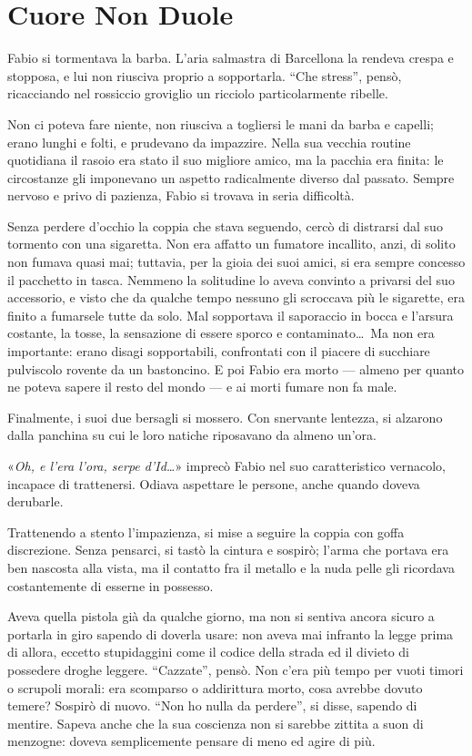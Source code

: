 \chapter{Cuore Non Duole}

Fabio si tormentava la barba. L'aria salmastra di Barcellona la rendeva crespa e stopposa, e lui non riusciva proprio a sopportarla. ``Che stress'', pensò, ricacciando nel rossiccio groviglio un ricciolo particolarmente ribelle.

Non ci poteva fare niente, non riusciva a togliersi le mani da barba e capelli; erano lunghi e folti, e prudevano da impazzire. Nella sua vecchia routine quotidiana il rasoio era stato il suo migliore amico, ma la pacchia era finita: le circostanze gli imponevano un aspetto radicalmente diverso dal passato. Sempre nervoso e privo di pazienza, Fabio si trovava in seria difficoltà.

Senza perdere d'occhio la coppia che stava seguendo, cercò di distrarsi dal suo tormento con una sigaretta. Non era affatto un fumatore incallito, anzi, di solito non fumava quasi mai; tuttavia, per la gioia dei suoi amici, si era sempre concesso il pacchetto in tasca. Nemmeno la solitudine lo aveva convinto a privarsi del suo accessorio, e visto che da qualche tempo nessuno gli scroccava più le sigarette, era finito a fumarsele tutte da solo. Mal sopportava il saporaccio in bocca e l'arsura costante, la tosse, la sensazione di essere sporco e contaminato\ldots\ Ma non era importante: erano disagi sopportabili, confrontati con il piacere di succhiare pulviscolo rovente da un bastoncino. E poi Fabio era morto --- almeno per quanto ne poteva sapere il resto del mondo --- e ai morti fumare non fa male.

Finalmente, i suoi due bersagli si mossero. Con snervante lentezza, si alzarono dalla panchina su cui le loro natiche riposavano da almeno un'ora.

«\textit{Oh, e l'era l'ora, serpe d'Id\ldots}» imprecò Fabio nel suo caratteristico vernacolo, incapace di trattenersi. Odiava aspettare le persone, anche quando doveva derubarle. 

Trattenendo a stento l'impazienza, si mise a seguire la coppia con goffa discrezione. Senza pensarci, si tastò la cintura e sospirò; l'arma che portava era ben nascosta alla vista, ma il contatto fra il metallo e la nuda pelle gli ricordava costantemente di esserne in possesso. 

Aveva quella pistola già da qualche giorno, ma non si sentiva ancora sicuro a portarla in giro sapendo di doverla usare: non aveva mai infranto la legge prima di allora, eccetto stupidaggini come il codice della strada ed il divieto di possedere droghe leggere. ``Cazzate'', pensò. Non c'era più tempo per vuoti timori o scrupoli morali: era scomparso o addirittura morto, cosa avrebbe dovuto temere? Sospirò di nuovo. ``Non ho nulla da perdere'', si disse, sapendo di mentire. Sapeva anche che la sua coscienza non si sarebbe zittita a suon di menzogne: doveva semplicemente pensare di meno ed agire di più.

